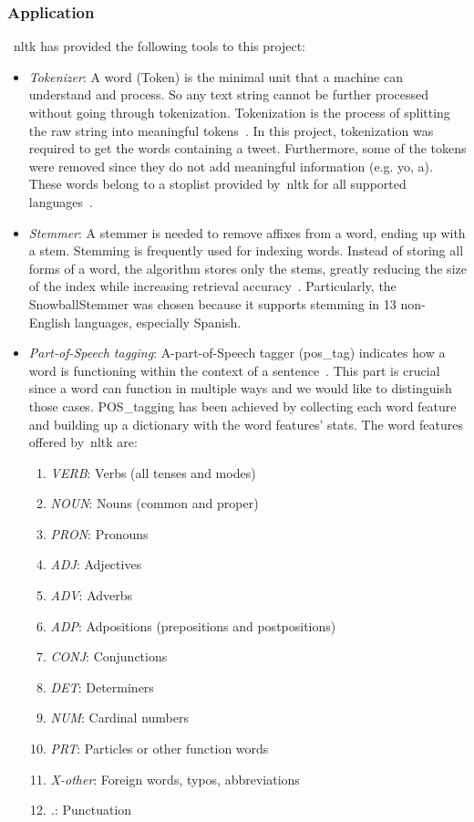 \subsubsection{Application}
~\ac{nltk} has provided the following tools to this project:
\begin{itemize}
	
	\item \textit{Tokenizer}: A word (Token) is the minimal unit that a machine can understand and process. So any text string cannot be further processed without going through tokenization. Tokenization is the process of splitting the raw string into meaningful tokens~\cite{nltk}. In this project, tokenization was required to get the words containing a tweet. Furthermore, some of the tokens were removed since they do not add meaningful information (e.g. yo, a). These words belong to a stoplist provided by~\ac{nltk} for all supported languages~\cite{nltk}.
	\item \textit{Stemmer}: A stemmer is needed to remove affixes from a word, ending up with a stem. Stemming is frequently used for indexing words. Instead of storing all forms of a word, the algorithm stores only the stems, greatly reducing the size of the index while increasing retrieval accuracy~\cite{nltk}. Particularly, the SnowballStemmer was chosen because it supports stemming in 13 non-English languages, especially Spanish.
	\item \textit{Part-of-Speech tagging}:  A-part-of-Speech tagger (pos\_tag) indicates how a word is functioning within the context of a sentence~\cite{pos}. This part is crucial since a word can function in multiple ways and we would like to distinguish those cases. POS\_tagging has been achieved by collecting each word feature and building up a dictionary with the word features' stats. The word features offered by~\ac{nltk} are:
	\begin{enumerate}
		\item \textit{VERB}: Verbs (all tenses and modes)
		\item \textit{NOUN}: Nouns (common and proper)
		\item \textit{PRON}: Pronouns
		\item \textit{ADJ}: Adjectives
		\item \textit{ADV}: Adverbs
		\item \textit{ADP}: Adpositions (prepositions and postpositions)
		\item \textit{CONJ}: Conjunctions
		\item \textit{DET}: Determiners
		\item \textit{NUM}: Cardinal numbers
		\item \textit{PRT}: Particles or other function words
		\item \textit{X-other}: Foreign words, typos, abbreviations
		\item \textit{.}: Punctuation
	\end{enumerate}
\end{itemize}

